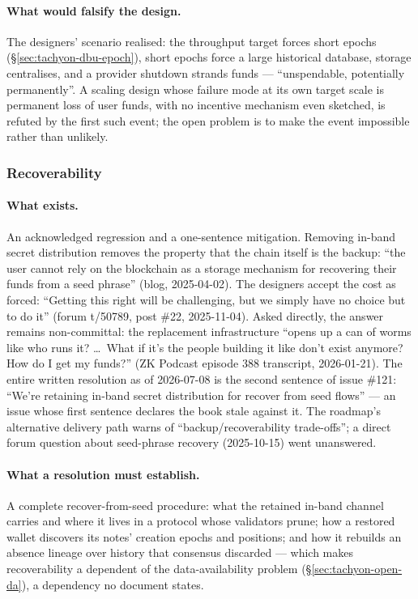 \documentclass[11pt,a4paper]{article}
\theoremstyle{definition}
\begin{document}
\paragraph{What would falsify the design.} The designers' scenario
realised: the throughput target forces short epochs
(\S\ref{sec:tachyon-dbu-epoch}), short epochs force a large historical
database, storage centralises, and a provider shutdown strands funds ---
``unspendable, potentially permanently''. A scaling design whose failure
mode at its own target scale is permanent loss of user funds, with no
incentive mechanism even sketched, is refuted by the first such event; the
open problem is to make the event impossible rather than unlikely.

\subsubsection{Recoverability}\label{sec:tachyon-open-recover}

\paragraph{What exists.} An acknowledged regression and a one-sentence
mitigation. Removing in-band secret distribution removes the property that
the chain itself is the backup: ``the user cannot rely on the blockchain as
a storage mechanism for recovering their funds from a seed phrase''
(blog, 2025-04-02). The designers accept the cost as forced: ``Getting this
right will be challenging, but we simply have no choice but to do it''
(forum t/50789, post \#22, 2025-11-04). Asked directly, the answer remains
non-committal: the replacement infrastructure ``opens up a can of worms
like who runs it? \ldots\ What if it's the people building it like don't
exist anymore? How do I get my funds?'' (ZK Podcast episode 388 transcript,
2026-01-21). The entire written resolution as of 2026-07-08 is the second
sentence of issue \#121: ``We're retaining in-band secret distribution for
recover from seed flows'' --- an issue whose first sentence declares the
book stale against it. The roadmap's alternative delivery path warns of
``backup/recoverability trade-offs''; a direct forum question about
seed-phrase recovery (2025-10-15) went unanswered.

\paragraph{What a resolution must establish.} A complete recover-from-seed
procedure: what the retained in-band channel carries and where it lives in
a protocol whose validators prune; how a restored wallet discovers its
notes' creation epochs and positions; and how it rebuilds an absence
lineage over history that consensus discarded --- which makes recoverability
a dependent of the data-availability problem
(\S\ref{sec:tachyon-open-da}), a dependency no document states.
\end{document}
